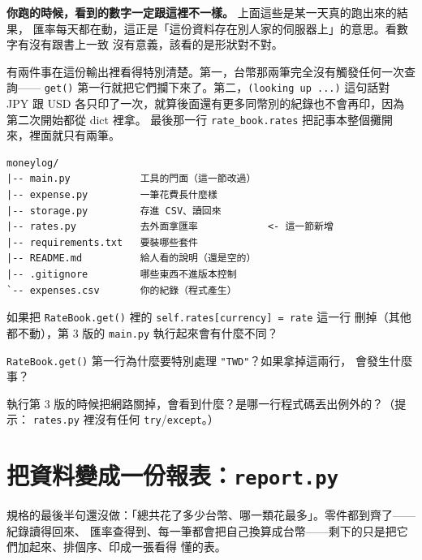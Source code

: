\textbf{你跑的時候，看到的數字一定跟這裡不一樣。} 上面這些是某一天真的跑出來的結果，
匯率每天都在動，這正是「這份資料存在別人家的伺服器上」的意思。看數字有沒有跟書上一致
沒有意義，該看的是形狀對不對。

有兩件事在這份輸出裡看得特別清楚。第一，台幣那兩筆完全沒有觸發任何一次查詢——
\texttt{get()} 第一行就把它們攔下來了。第二，\texttt{(looking up ...)} 這句話對 JPY 跟
USD 各只印了一次，就算後面還有更多同幣別的紀錄也不會再印，因為第二次開始都從 dict 裡拿。
最後那一行 \texttt{rate\_book.rates} 把記事本整個攤開來，裡面就只有兩筆。

\begin{verbatim}
moneylog/
|-- main.py            工具的門面（這一節改過）
|-- expense.py         一筆花費長什麼樣
|-- storage.py         存進 CSV、讀回來
|-- rates.py           去外面拿匯率            <- 這一節新增
|-- requirements.txt   要裝哪些套件
|-- README.md          給人看的說明（還是空的）
|-- .gitignore         哪些東西不進版本控制
`-- expenses.csv       你的紀錄（程式產生）
\end{verbatim}

\begin{drills}[label=drills:capstone-rates]
\item 如果把 \texttt{RateBook.get()} 裡的 \texttt{self.rates[currency] = rate} 這一行
刪掉（其他都不動），第 3 版的 \texttt{main.py} 執行起來會有什麼不同？
\item \texttt{RateBook.get()} 第一行為什麼要特別處理 \texttt{"TWD"}？如果拿掉這兩行，
會發生什麼事？
\item 執行第 3 版的時候把網路關掉，會看到什麼？是哪一行程式碼丟出例外的？（提示：
\texttt{rates.py} 裡沒有任何 \texttt{try}/\texttt{except}。）
\end{drills}

\section{把資料變成一份報表：\texttt{report.py}}
\label{sec:capstone-report}

規格的最後半句還沒做：「總共花了多少台幣、哪一類花最多」。零件都到齊了——紀錄讀得回來、
匯率查得到、每一筆都會把自己換算成台幣——剩下的只是把它們加起來、排個序、印成一張看得
懂的表。

